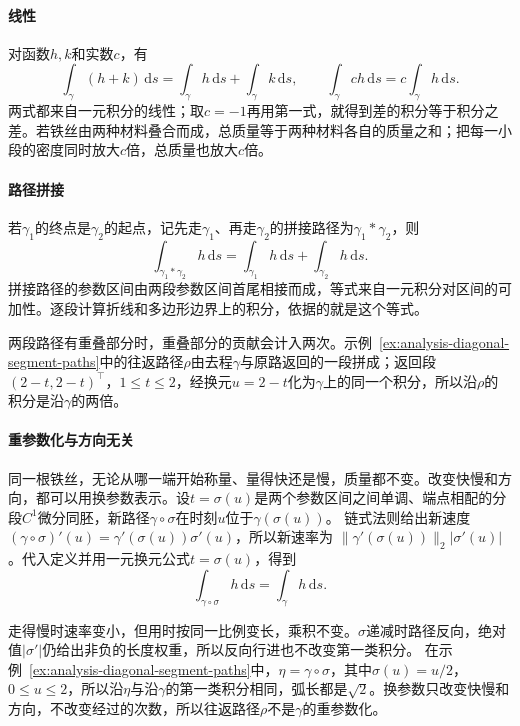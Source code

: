 \paragraph{线性}

对函数$h,k$和实数$c$，有
\[
 \int_\gamma(h+k)\,\mathrm ds=\int_\gamma h\,\mathrm ds+\int_\gamma k\,\mathrm ds,
 \qquad
 \int_\gamma ch\,\mathrm ds=c\int_\gamma h\,\mathrm ds.
\]
两式都来自一元积分的线性；取$c=-1$再用第一式，就得到差的积分等于积分之差。若铁丝由两种材料叠合而成，总质量等于两种材料各自的质量之和；把每一小段的密度同时放大$c$倍，总质量也放大$c$倍。

\paragraph{路径拼接}

若$\gamma_1$的终点是$\gamma_2$的起点，记先走$\gamma_1$、再走$\gamma_2$的拼接路径为$\gamma_1*\gamma_2$，则
\[
 \int_{\gamma_1*\gamma_2}h\,\mathrm ds
 =\int_{\gamma_1}h\,\mathrm ds+\int_{\gamma_2}h\,\mathrm ds.
\]
拼接路径的参数区间由两段参数区间首尾相接而成，等式来自一元积分对区间的可加性。逐段计算折线和多边形边界上的积分，依据的就是这个等式。

两段路径有重叠部分时，重叠部分的贡献会计入两次。示例~\ref{ex:analysis-diagonal-segment-paths}中的往返路径$\rho$由去程$\gamma$与原路返回的一段拼成；返回段$(2-t,2-t)^\top$，$1\leq t\leq2$，经换元$u=2-t$化为$\gamma$上的同一个积分，所以沿$\rho$的积分是沿$\gamma$的两倍。

\paragraph{重参数化与方向无关}

同一根铁丝，无论从哪一端开始称量、量得快还是慢，质量都不变。改变快慢和方向，都可以用换参数表示。设$t=\sigma(u)$是两个参数区间之间单调、端点相配的分段$C^1$微分同胚，新路径$\gamma\circ\sigma$在时刻$u$位于$\gamma(\sigma(u))$。
链式法则给出新速度$(\gamma\circ\sigma)'(u)=\gamma'(\sigma(u))\sigma'(u)$，所以新速率为
$\lVert\gamma'(\sigma(u))\rVert_2|\sigma'(u)|$。代入定义并用一元换元公式$t=\sigma(u)$，得到
\[
 \int_{\gamma\circ\sigma}h\,\mathrm ds=\int_\gamma h\,\mathrm ds.
\]

走得慢时速率变小，但用时按同一比例变长，乘积不变。$\sigma$递减时路径反向，绝对值$|\sigma'|$仍给出非负的长度权重，所以反向行进也不改变第一类积分。
在示例~\ref{ex:analysis-diagonal-segment-paths}中，$\eta=\gamma\circ\sigma$，其中$\sigma(u)=u/2$，$0\leq u\leq2$，所以沿$\eta$与沿$\gamma$的第一类积分相同，弧长都是$\sqrt2$。换参数只改变快慢和方向，不改变经过的次数，所以往返路径$\rho$不是$\gamma$的重参数化。

